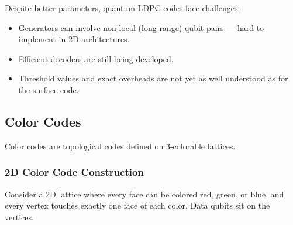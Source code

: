 \documentclass[11pt, a4paper]{article}
\theoremstyle{definition}
\theoremstyle{plain}
\theoremstyle{remark}
\begin{document}
Despite better parameters, quantum LDPC codes face challenges:
\begin{itemize}
  \item Generators can involve non-local (long-range) qubit pairs --- hard
        to implement in 2D architectures.
  \item Efficient decoders are still being developed.
  \item Threshold values and exact overheads are not yet as well understood
        as for the surface code.
\end{itemize}

\subsection{Color Codes}

Color codes are topological codes defined on 3-colorable lattices.

\subsubsection{2D Color Code Construction}

Consider a 2D lattice where every face can be colored red, green, or blue,
and every vertex touches exactly one face of each color.  Data qubits sit on
the vertices.
\end{document}
